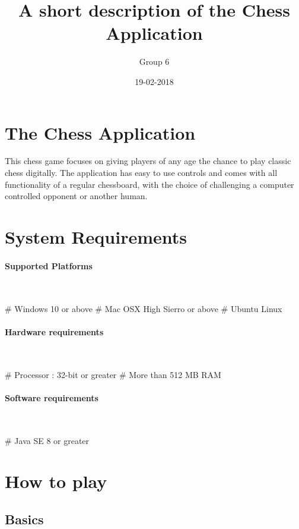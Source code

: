 \documentclass{article}
\title{A short description of the Chess Application}
\author{Group 6}
\date{19-02-2018}
\begin{document}
\maketitle

\section*{The Chess Application}

This chess game focuses on giving players of any age the chance to play classic chess digitally. The application has easy to use controls and comes with all functionality of a regular chessboard, with the choice of challenging a computer controlled opponent or another human.

\section*{System Requirements}
\paragraph{Supported Platforms}\mbox{}\\
\begin{easylist}[itemize]
    # Windows 10 or above
    # Mac OSX High Sierro or above
    # Ubuntu Linux
\end{easylist}
\paragraph{Hardware requirements}\mbox{}\\
\begin{easylist}[itemize]
    # Processor : 32-bit or greater
    # More than 512 MB RAM
\end{easylist}
\paragraph{Software requirements}\mbox{}\\
\begin{easylist}[itemize]
    # Java SE 8 or greater
\end{easylist}

\newpage

\section*{How to play}
\subsection*{Basics}
\end{document}
